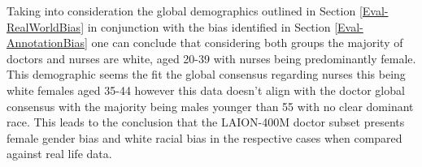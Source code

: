 

Taking into consideration the global demographics outlined in Section \ref{Eval-RealWorldBias} in conjunction with the bias identified in Section \ref{Eval-AnnotationBias} one can conclude that considering both groups the majority of doctors and nurses are white, aged 20-39 with nurses being predominantly female. This demographic seems the fit the global consensus regarding nurses this being white females aged 35-44 however this data doesn't align with the doctor global consensus with the majority being males younger than 55 with no clear dominant race. This leads to the conclusion that the LAION-400M doctor subset presents female gender bias and white racial bias in the respective cases when compared against real life data. 


